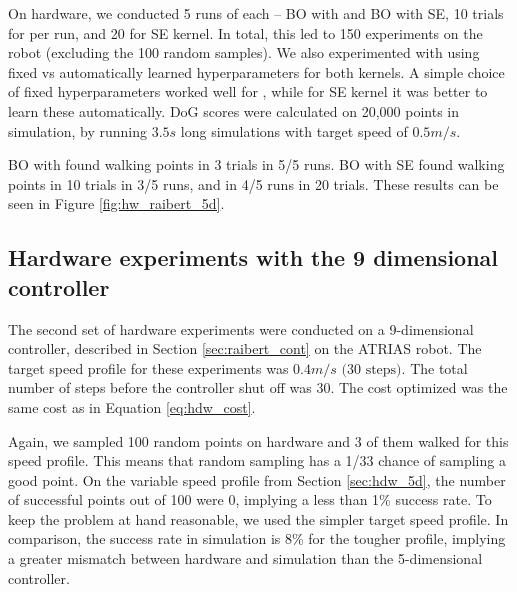 On hardware, we conducted 5 runs of each -- BO with \dogkernel and BO with SE, 10 trials for \dogkernel per run, and 20 for SE kernel. In total, this led to 150 experiments on the robot (excluding the 100 random samples). We also experimented with using fixed vs automatically learned hyperparameters for both kernels. A simple choice of fixed hyperparameters worked well for \dogkernel, while for SE kernel it was better to learn these automatically. DoG scores were calculated on 20,000 points in simulation, by running $3.5s$ long simulations with target speed of $0.5m/s$.

BO with \dogkernel found walking points in 3 trials in 5/5 runs. BO with SE found walking points in 10 trials in 3/5 runs, and in 4/5 runs in 20 trials. These results can be seen in Figure \ref{fig:hw_raibert_5d}.



\subsection{Hardware experiments with the 9 dimensional controller}
The second set of hardware experiments were conducted on a 9-dimensional controller, described in Section \ref{sec:raibert_cont} on the ATRIAS robot. The target speed profile for these experiments was $0.4 m/s \text{ (30 steps)}$. The total number of steps before the controller shut off was $30$. The cost optimized was the same cost as in Equation \ref{eq:hdw_cost}. 

Again, we sampled 100 random points on hardware and 3 of them walked for this speed profile. This means that random sampling has a 1/33 chance of sampling a good point. On the variable speed profile from Section \ref{sec:hdw_5d}, the number of successful points out of 100 were 0, implying a less than 1\% success rate. To keep the problem at hand reasonable, we used the simpler target speed profile. In comparison, the success rate in simulation is 8\% for the tougher profile, implying a greater mismatch between hardware and simulation than the 5-dimensional controller. 

